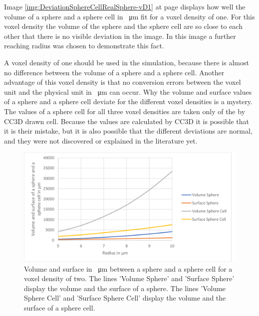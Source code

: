 Image \ref{img:DeviationSphereCellRealSphere-vD1} at page \pageref{img:DeviationSphereCellRealSphere-vD1} displays how well the volume of a sphere and a sphere cell in \SI{}{\micro\metre} fit for a voxel density of one. For this voxel density the volume of the sphere and the sphere cell are so close to each other that there is no visible deviation in the image. In this image a further reaching radius was chosen to demonstrate this fact.

A voxel density of one should be used in the simulation, because there is almost no difference between the volume of a sphere and a sphere cell. Another advantage of this voxel density is that no conversion errors between the voxel unit and the physical unit in \SI{}{\micro\metre} can occur. \newline
Why the volume and surface values of a sphere and a sphere cell deviate for the different voxel densities is a mystery. The values of a sphere cell for all three voxel densities are taken only of the by \ac{CC3D} drawn cell. Because the values are calculated by \ac{CC3D} it is possible that it is their mistake, but it is also possible that the different deviations are normal, and they were not discovered or explained in the literature yet.

\vspace{2cm}
\begin{figure}[H]
	\center
	\includegraphics[scale=0.3]{figures/DeviationSphereToPixelSphere-vD2.png}
	\caption[Volume and surface in \SI{}{\micro\metre} between a sphere and a sphere cell for a voxel density of two]{Volume and surface in \SI{}{\micro\metre} between a sphere and a sphere cell for a voxel density of two. The lines 'Volume Sphere' and 'Surface Sphere' display the volume and the surface of a sphere. The lines 'Volume Sphere Cell' and 'Surface Sphere Cell' display the volume and the surface of a sphere cell.}
	\label{img:DeviationSphereCellRealSphere-vD2}
\end{figure}

